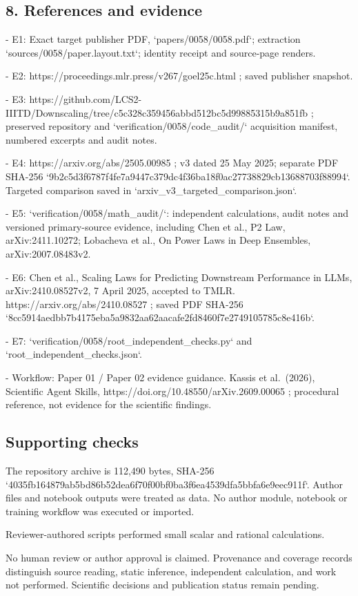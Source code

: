 \documentclass[10pt]{article}
\begin{document}
\subsection*{8. References and evidence}
- E1: Exact target publisher PDF, `papers/0058/0058.pdf`; extraction `sources/0058/paper.layout.txt`; identity receipt and source-page renders.\par
- E2: https://proceedings.mlr.press/v267/goel25c.html ; saved publisher snapshot.\par
- E3: https://github.com/LCS2-IIITD/Downscaling/tree/c5c328c359456abbd512bc5d99885315b9a851fb ; preserved repository and `verification/0058/code\_audit/` acquisition manifest, numbered excerpts and audit notes.\par
- E4: https://arxiv.org/abs/2505.00985 ; v3 dated 25 May 2025; separate PDF SHA-256 `9b2c5d3f6787f4fe7a9447c379dc4f36ba18f0ac27738829cb13688703f88994`. Targeted comparison saved in `arxiv\_v3\_targeted\_comparison.json`.\par
- E5: `verification/0058/math\_audit/`: independent calculations, audit notes and versioned primary-source evidence, including Chen et al., P2 Law, arXiv:2411.10272; Lobacheva et al., On Power Laws in Deep Ensembles, arXiv:2007.08483v2.\par
- E6: Chen et al., Scaling Laws for Predicting Downstream Performance in LLMs, arXiv:2410.08527v2, 7 April 2025, accepted to TMLR. https://arxiv.org/abs/2410.08527 ; saved PDF SHA-256 `8cc5914aedbb7b4175eba5a9832aa62aacafe2fd8460f7e2749105785c8e416b`.\par
- E7: `verification/0058/root\_independent\_checks.py` and `root\_independent\_checks.json`.\par
- Workflow: Paper 01 / Paper 02 evidence guidance. Kassis et al. (2026), Scientific Agent Skills, https://doi.org/10.48550/arXiv.2609.00065 ; procedural reference, not evidence for the scientific findings.\par
\subsection*{Supporting checks}
The repository archive is 112,490 bytes, SHA-256 `4035fb164879ab5bd86b52dea6f70f00bf0ba3f6ea4539dfa5bbfa6e9eec911f`. Author files and notebook outputs were treated as data. No author module, notebook or training workflow was executed or imported.\par
Reviewer-authored scripts performed small scalar and rational calculations.\par
No human review or author approval is claimed. Provenance and coverage records distinguish source reading, static inference, independent calculation, and work not performed. Scientific decisions and publication status remain pending.\par
\end{document}
